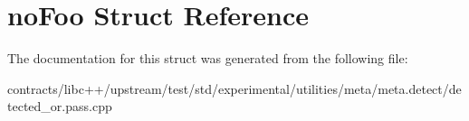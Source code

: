 \hypertarget{structno_foo}{}\section{no\+Foo Struct Reference}
\label{structno_foo}


The documentation for this struct was generated from the following file\+:\begin{DoxyCompactItemize}
\item 
contracts/libc++/upstream/test/std/experimental/utilities/meta/meta.\+detect/detected\+\_\+or.\+pass.\+cpp\end{DoxyCompactItemize}
